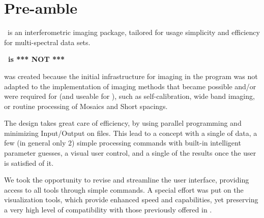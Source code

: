 \section{Pre-amble}


\imager\ is an interferometric imaging package, tailored for usage
  simplicity and efficiency for multi-spectral data sets.

\textbf{\imager\  is *** NOT *** \mapping }

\imager{} was created because the initial infrastructure for imaging
in the \mapping{} program was not adapted to the implementation 
of imaging methods that became possible and/or were required for
\NOEMA{} (and useable for \ALMA{}), such as self-calibration,
wide band imaging, or routine processing of Mosaics and Short spacings.
 
The \imager{} design takes great care of efficiency, by using parallel 
programming and minimizing Input/Output on files. This lead to a 
concept with a single  of data, a few (in general only 2) 
simple processing commands with built-in intelligent parameter guesses, 
a visual user control, and a single  of the results once the 
user is satisfied of it.

We took the opportunity to revise and streamline the user interface,
providing access to all tools through simple commands. A special
effort was put on the visualization tools, which provide enhanced
speed and capabilities, yet preserving a very high level of compatibility
with those previously offered in \mapping{} .


